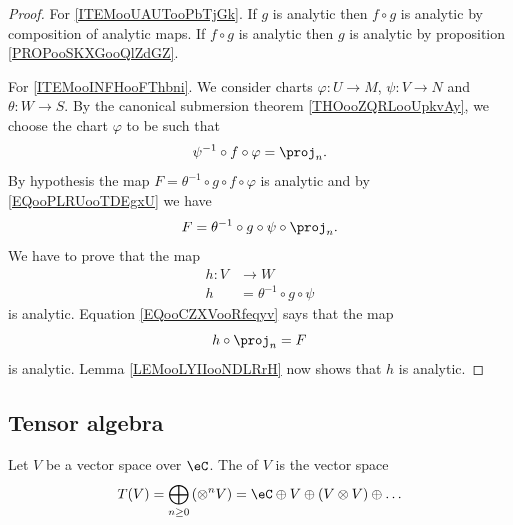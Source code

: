 \begin{proof}
	For \ref{ITEMooUAUTooPbTjGk}. If \( g\) is analytic then \( f\circ g\) is analytic by composition of analytic maps. If \( f\circ g\) is analytic then \( g\) is analytic by proposition \ref{PROPooSKXGooQlZdGZ}.

	For \ref{ITEMooINFHooFThbni}. We consider charts \(\varphi \colon U\to M  \), \(\psi \colon V\to N  \) and \(\theta \colon W\to S  \). By the canonical submersion theorem \ref{THOooZQRLooUpkvAy}, we choose the chart \( \varphi\) to be such that
	\begin{equation}		\label{EQooPLRUooTDEgxU}
		\psi^{-1}\circ f\circ \varphi=\proj_n.
	\end{equation}
	By hypothesis the map \( F=\theta^{-1}\circ g\circ f\circ\varphi\) is analytic and by \eqref{EQooPLRUooTDEgxU} we have
	\begin{equation}		\label{EQooCZXVooRfeqyv}
		F=\theta^{-1}\circ g\circ \psi\circ\proj_n.
	\end{equation}
	We have to prove that the map
	\begin{equation}
		\begin{aligned}
			h\colon V & \to W                        \\
			h         & =\theta^{-1}\circ g\circ\psi
		\end{aligned}
	\end{equation}
	is analytic. Equation \eqref{EQooCZXVooRfeqyv} says that the map
	\begin{equation}
		h\circ\proj_n=F
	\end{equation}
	is analytic. Lemma \ref{LEMooLYIIooNDLRrH} now shows that \( h\) is analytic.
\end{proof}


\subsection{Tensor algebra}

\begin{definition}      \label{DEFooHPQXooETvEyn}
	Let \( V\) be a vector space over \( \eC\). The  of \( V\) is the vector space
	\begin{equation}
		T(V)=\bigoplus_{n\geq 0}\left(\otimes^nV\right)=\eC\oplus V\oplus(V\otimes V)\oplus\ldots
	\end{equation}
\end{definition}


